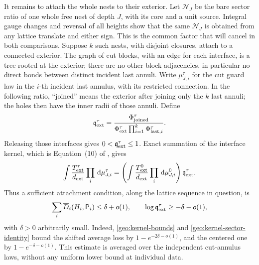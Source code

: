 It remains to attach the whole nests to their exterior.
Let \(\mathcal N_J\) be the bare sector ratio of one whole
free nest of depth \(J\), with its core and a unit source.  Integral
gauge changes and reversal of all heights show that the same
\(\mathcal N_J\) is obtained from any lattice translate and either
sign.  This is the common factor that will cancel in both comparisons.
Suppose \(k\) such nests, with disjoint closures, attach to a
connected exterior.  The graph of cut blocks, with an edge for each
interface, is a tree rooted at the exterior; there are no other block
adjacencies, in particular no direct bonds between distinct incident
last annuli.  Write \(\mu_{J,i}^\tau\) for the cut guard law in
the \(i\)-th incident last annulus, with its restricted connection.
In the following ratio, ``joined'' means the
exterior after joining only the \(k\) last annuli; the holes then have
the inner radii of those annuli.  Define
\begin{equation}\label{geo:joining-ratio}
 \mathfrak q^\tau_{\rm ext}
  =\frac{\Phi_{\rm joined}^\tau}
         {\Phi_{\rm ext}^\tau\prod_{i=1}^k\Phi_{{\rm last},i}^\tau}.
\end{equation}
Releasing those interfaces gives \(0<\mathfrak q^\tau_{\rm ext}\le1\).
Exact summation of the interface kernel, which is Equation~(10) of
\cite{S}, gives
\begin{equation}\label{geo:kernel-sector-identity}
 \int\frac{T^\tau_{\rm ext}}{d_{\rm ext}}
              \prod_i\,\mathrm d\mu_{J,i}^\tau
 =\left(\int\frac{T^0_{\rm ext}}{d_{\rm ext}}
              \prod_i\,\mathrm d\mu_{J,i}^0\right)\mathfrak q^\tau_{\rm ext}.
\end{equation}
Thus a sufficient attachment condition, along the lattice sequence
in question, is
\begin{equation}\label{geo:attachment-condition}
 \sum_i\overline D_i(H_i,\mathsf P_i)\le\delta+o(1),
 \qquad \log\mathfrak q^\tau_{\rm ext}\ge-\delta-o(1),
\end{equation}
with \(\delta>0\) arbitrarily small.  Indeed,
\eqref{geo:kernel-bounds} and \eqref{geo:kernel-sector-identity}
bound the shifted average loss by
\(1-e^{-2\delta-o(1)}\), and the centered one by
\(1-e^{-\delta-o(1)}\).  This estimate is averaged over the independent
cut-annulus laws, without any uniform lower bound at individual data.

